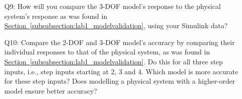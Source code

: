 \documentclass[12pt]{report}
\newcommand\drew[1]{\textcolor{red}{#1}}
\begin{document}
\begin{enumerate}[Question]
    \item[Q9:]How will you compare the 3-DOF model's response to the physical system's response as was found in \hyperref[subsubsection:lab1_modelvalidation]{Section~\ref{subsubsection:lab1_modelvalidation}}, using your Simulink data?\\
    \item[Q10:] Compare the 2-DOF and 3-DOF model's accuracy by comparing their individual responses to that of the physical system, as was found in \hyperref[subsubsection:lab1_modelvalidation]{Section~\ref{subsubsection:lab1_modelvalidation}}. Do this for all three step inputs, i.e., step inputs starting at 2, 3 and 4. Which model is more accurate for these step inputs? Does modelling a physical system with a higher-order model ensure better accuracy?\\
\end{enumerate}
\end{document}
